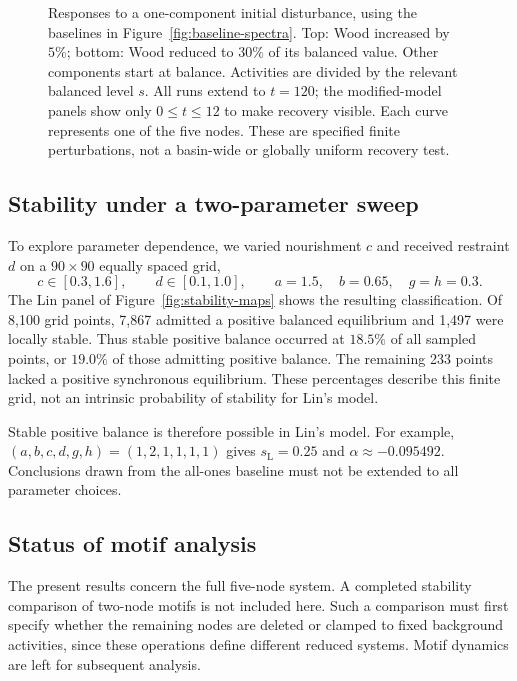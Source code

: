 \begin{figure}[tbp]
\centering
\PreliminaryTrajectoryFigure
\caption{Responses to a one-component initial disturbance, using the
baselines in Figure~\ref{fig:baseline-spectra}. Top: Wood increased by
$5\%$; bottom: Wood reduced to $30\%$ of its balanced value. Other
components start at balance. Activities are divided by the relevant
balanced level $s$. All runs extend to $t=120$; the modified-model panels
show only $0\leq t\leq12$ to make recovery visible. Each curve represents
one of the five nodes. These are specified finite perturbations, not a
basin-wide or globally uniform recovery test.}
\label{fig:disturbance}
\end{figure}

\subsection{Stability under a two-parameter sweep}
To explore parameter dependence, we varied nourishment $c$ and received
restraint $d$ on a $90\times90$ equally spaced grid,
\begin{equation}
 c\in[0.3,1.6],\qquad d\in[0.1,1.0],\qquad
 a=1.5,\quad b=0.65,\quad g=h=0.3.
 \label{eq:lin-sweep}
\end{equation}
The Lin panel of Figure~\ref{fig:stability-maps} shows the resulting
classification. Of 8,100 grid points, 7,867 admitted a positive balanced
equilibrium and 1,497 were locally stable. Thus stable positive balance
occurred at $18.5\%$ of all sampled points, or $19.0\%$ of those admitting
positive balance. The remaining 233 points lacked a positive synchronous
equilibrium. These percentages describe this finite grid, not an intrinsic
probability of stability for Lin's model.

Stable positive balance is therefore possible in Lin's model. For example,
$(a,b,c,d,g,h)=(1,2,1,1,1,1)$ gives $s_{\mathrm L}=0.25$ and
$\alpha\approx-0.095492$. Conclusions drawn from the all-ones baseline
must not be extended to all parameter choices.

\subsection{Status of motif analysis}
The present results concern the full five-node system. A completed stability
comparison of two-node motifs is not included here. Such a comparison must
first specify whether the remaining nodes are deleted or clamped to fixed
background activities, since these operations define different reduced
systems. Motif dynamics are left for subsequent analysis.

